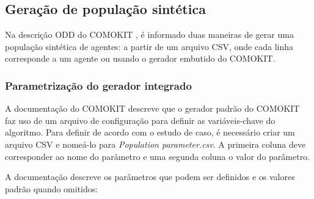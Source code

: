 \subsection{Geração de população sintética}

Na descrição ODD do COMOKIT \cite{ODDCOMOKit32}, é informado duas maneiras de gerar uma população sintética de agentes: a partir de um arquivo CSV, onde cada linha corresponde a um agente ou usando o gerador embutido do COMOKIT.

\subsubsection{Parametrização do gerador integrado}

A documentação do COMOKIT \cite{ComokitDoc} descreve que o gerador padrão do COMOKIT faz uso de um arquivo de configuração para definir as variáveis-chave do algoritmo. Para definir de acordo com o estudo de caso, é necessário criar um arquivo CSV e nomeá-lo para \textit{Population parameter.csv}. A primeira coluna deve corresponder ao nome do parâmetro e uma segunda coluna o valor do parâmetro.

A documentação descreve os parâmetros que podem ser definidos e os valores padrão quando omitidos:

